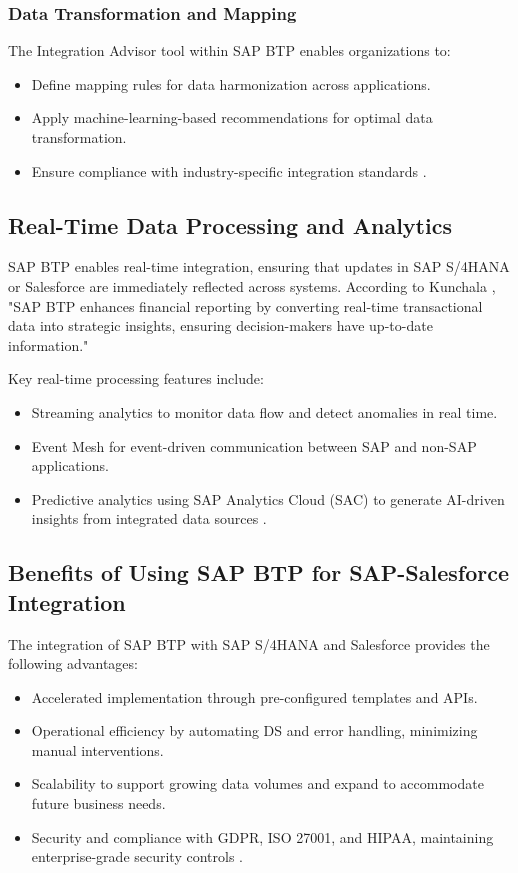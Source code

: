 \subsubsection{Data Transformation and Mapping}
The Integration Advisor tool within SAP BTP enables organizations to:
\begin{itemize}
\item Define mapping rules for data harmonization across applications.
\item Apply machine-learning-based recommendations for optimal data transformation.
\item Ensure compliance with industry-specific integration standards \cite{kunchala2024}.
\end{itemize}

\subsection{Real-Time Data Processing and Analytics}

SAP BTP enables real-time integration, ensuring that updates in SAP S/4HANA or Salesforce are immediately reflected across systems. According to Kunchala \cite{kunchala2024}, "SAP BTP enhances financial reporting by converting real-time transactional data into strategic insights, ensuring decision-makers have up-to-date information."

Key real-time processing features include:
\begin{itemize}
\item Streaming analytics to monitor data flow and detect anomalies in real time.
\item Event Mesh for event-driven communication between SAP and non-SAP applications.
\item Predictive analytics using SAP Analytics Cloud (SAC) to generate AI-driven insights from integrated data sources \cite{kunchala2024}.
\end{itemize}

\subsection{Benefits of Using SAP BTP for SAP-Salesforce Integration}

The integration of SAP BTP with SAP S/4HANA and Salesforce provides the following advantages:
\begin{itemize}
\item Accelerated implementation through pre-configured templates and APIs.
\item Operational efficiency by automating DS and error handling, minimizing manual interventions.
\item Scalability to support growing data volumes and expand to accommodate future business needs.
\item Security and compliance with GDPR, ISO 27001, and HIPAA, maintaining enterprise-grade security controls \cite{sap2020}.
\end{itemize}


